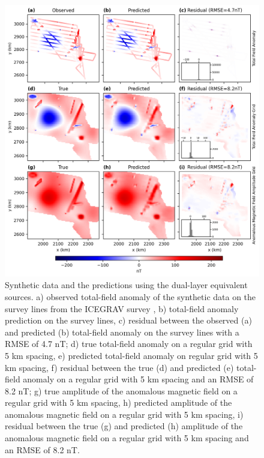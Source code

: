 \begin{figure}[tb!]
\centering
\includegraphics[width=1\linewidth]{figures/dual_layer_synthetic.png}
\caption{
    Synthetic data and the predictions using the dual-layer equivalent sources. a) observed total-field anomaly of the synthetic data on the survey lines from the ICEGRAV survey \citep{ICEGRAV_data}, b) total-field anomaly prediction on the survey lines, c) residual between the observed (a) and predicted (b) total-field anomaly on the survey lines with a RMSE of 4.7 nT; d) true total-field anomaly on a regular grid with 5 km spacing, e) predicted total-field anomaly on regular grid with 5 km spacing, f) residual between the true (d) and predicted (e) total-field anomaly on a regular grid with 5 km spacing and an RMSE of 8.2 nT; g) true amplitude of the anomalous magnetic field on a regular grid with 5 km spacing, h) predicted amplitude of the anomalous magnetic field on a regular grid with 5 km spacing, i) residual between the true (g) and predicted (h) amplitude of the anomalous magnetic field on a regular grid with 5 km spacing and an RMSE of 8.2 nT.
}
\label{fig:dual_layer_synthetic}
\end{figure}

